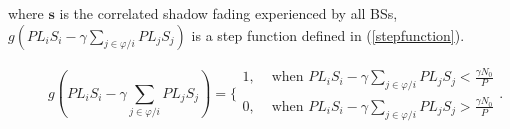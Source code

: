 \documentclass[journal,comsoc]{IEEEtran}
\begin{document}
where $\mathbf{s}$ is the correlated shadow fading experienced by all BSs, $g(PL_{i}S_{i} - \gamma\sum_{j\in\varphi/i}PL_{j}S_{j})$ is a step function defined in (\ref{stepfunction}).
\begin{figure}[!t]
\normalsize

\begin{equation}
\label{stepfunction}
g(PL_{i}S_{i} - \gamma\sum_{j\in\varphi/i}PL_{j}S_{j}) = \{\begin{array}{cc}
               1, &  \text{  when }PL_{i}S_{i} - \gamma\sum_{j\in\varphi/i}PL_{j}S_{j} <\frac{\gamma N_{0}}{P}\\
               0, & \text{  when }PL_{i}S_{i} - \gamma\sum_{j\in\varphi/i}PL_{j}S_{j} >\frac{\gamma N_{0}}{P}
             \end{array}.
\end{equation}
\hrulefill
\vspace*{4pt}
\end{figure}
\end{document}

